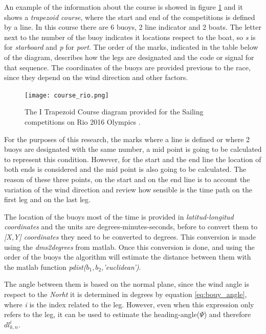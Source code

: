 An example of the information about the course is showed in figure \ref{fig:Rio_Course1} and it shows a \textit{trapezoid course}, where the start and end of the competitions is defined by a line. In this course there are 6 buoys, 2 line indicator and 2 boats. The letter next to the number of the buoy indicates it locations respect to the boat, so \textit{s} is for \textit{starboard} and \textit{p} for \textit{port}. The order of the marks, indicated in the table below of the diagram, describes how the legs are designated and the code or signal for that sequence. The coordinates of the buoys are provided previous to the race, since they depend on the wind direction and other factors.  \par 
\begin{figure} [hbt!]
    \centering
    \texttt{[image: course\_rio.png]}
    \caption{The I Trapezoid Course diagram provided for the Sailing competitions on Rio 2016 Olympics \cite{sailoly}.}
    \label{fig:Rio_Course1}
\end{figure}
For the purposes of this research, the marks where a line is defined or where 2 buoys are designated with the same number, a mid point is going to be calculated to represent this condition. However, for the start and the end line the location of both ends is considered and the mid point is also going to be calculated. The reason of these three points, on the start and on the end line is to account the variation of the wind direction and review how sensible is the time path on the first leg and on the last leg. \par

The location of the buoys most of the time is provided in \textit{latitud-longitud coordinates} and the units are degrees-minutes-seconds, before to convert them to \textit{[X,Y] coordinates} they need to be converted to degrees. This conversion is made using the \textit{dms2degrees} from \acrshort{matlab}. Once this conversion is done, and using the order of the buoys the algorithm will estimate the distance between them with the \acrshort{matlab} function \textit{pdist($b_{1},b_{2}$,'euclidean')}. \par \noindent The angle between them is based on the normal plane, since the wind angle is respect to the \textit{Norht} it is determined in degrees by equation \ref{eq:bouy_angle}, where \textit{i} is the index related to the leg. However, even when this expression only refers to the leg, it can be used to estimate the heading-angle($\Psi$) and  therefore $dl_{k,n}^{i}$. \par 


